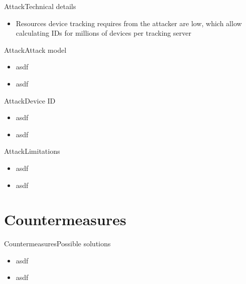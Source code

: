 \documentclass[aspectratio=169, hyperref={colorlinks=true, allcolors=SecondaryColor}, c]{beamer}
\begin{document}
\begin{frame}[fragile]{Attack}{Technical details}
\begin{itemize}
			\begin{itemize}
				\item Resources device tracking requires from the attacker are low, which allow calculating IDs for millions of devices per tracking server
			\end{itemize}
		\end{itemize}
	\fi
\end{frame}

\begin{frame}[fragile]{Attack}{Attack model}
	\ifbeamer
		\begin{itemize}
			\item asdf
		\end{itemize}
	\else
		\begin{itemize}
			\item asdf
		\end{itemize}
	\fi
\end{frame}

\begin{frame}[fragile]{Attack}{Device ID}
	\ifbeamer
		\begin{itemize}
			\item asdf
		\end{itemize}
	\else
		\begin{itemize}
			\item asdf
		\end{itemize}
	\fi
\end{frame}

\begin{frame}[fragile]{Attack}{Limitations}
	\ifbeamer
		\begin{itemize}
			\item asdf
		\end{itemize}
	\else
		\begin{itemize}
			\item asdf
		\end{itemize}
	\fi
\end{frame}

\section{Countermeasures}

\begin{frame}[fragile]{Countermeasures}{Possible solutions}
	\ifbeamer
		\begin{itemize}
			\item asdf
		\end{itemize}
	\else
		\begin{itemize}
			\item asdf
		\end{itemize}
	\fi
\end{frame}
\end{document}
